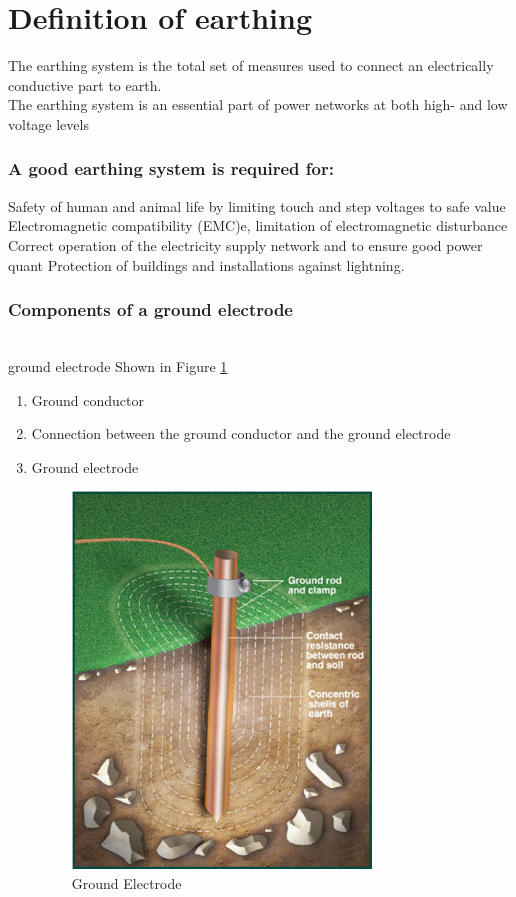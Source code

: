 \documentclass[12pt,fleqn]{book} %
\begin{document}
\section{Definition of earthing}
The earthing system is the total set of measures used to connect an electrically conductive part to earth. 
\\ The earthing system is an essential part of power networks at both high- and low voltage levels
\subsubsection{A good earthing system is required for:}
Safety of human and animal life by limiting touch and step voltages to safe value Electromagnetic compatibility (EMC)e, limitation of electromagnetic disturbance Correct operation of the electricity supply network and to ensure good power quant Protection of buildings and installations against lightning.
\subsubsection{Components of a ground electrode}
\\ ground electrode Shown in Figure \ref{fig:earth 1}
\begin{enumerate}
    \item Ground conductor
    \item Connection between the ground conductor and the ground electrode
    \item Ground electrode
\begin{figure}[!h]
    \centering
    \includegraphics[width=0.5\linewidth]{earth 1.png}
    \caption{Ground Electrode}
    \label{fig:earth 1}
\end{figure}
\end{enumerate}
\end{document}

